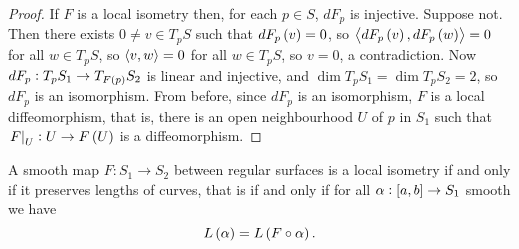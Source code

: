 \begin{proof}
If $ F $ is a local isometry then, for each $ p \in S $, $ dF_p $ is injective. Suppose not. Then there exists $ 0 \ne v \in T_pS $ such that $ dF_p\br{v} = 0 $, so $ \abr{dF_p\br{v}, dF_p\br{w}} = 0 $ for all $ w \in T_pS $, so $ \left\langle v, w \right\rangle = 0 $ for all $ w\in T_pS $, so $ v = 0 $, a contradiction. Now $ dF_p : T_pS_1 \to T_{F\br{p}}S_2 $ is linear and injective, and $ \dim T_pS_1 = \dim T_pS_2 = 2 $, so $ dF_p $ is an isomorphism. From before, since $ dF_p $ is an isomorphism, $ F $ is a local diffeomorphism, that is, there is an open neighbourhood $ U $ of $ p $ in $ S_1 $ such that $ \eval{F}_U : U \to F\br{U} $ is a diffeomorphism.
\end{proof}

\begin{proposition}
A smooth map $ F : S_1 \to S_2 $ between regular surfaces is a local isometry if and only if it preserves lengths of curves, that is if and only if for all $ \alpha : \sbr{a, b} \to S_1 $ smooth we have
$$ L\br{\alpha} = L\br{F \circ \alpha}. $$
\end{proposition}

